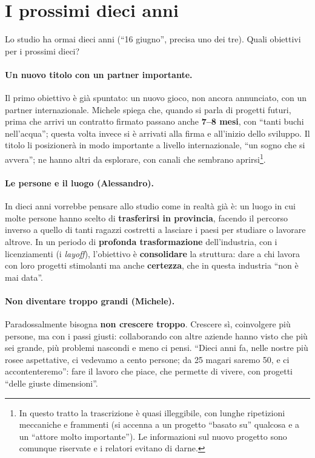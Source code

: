 \section{I prossimi dieci anni}
\label{sec:c1-3-futuro}

Lo studio ha ormai dieci anni (``16 giugno'', precisa uno dei tre). Quali
obiettivi per i prossimi dieci?

\paragraph{Un nuovo titolo con un partner importante.} Il primo obiettivo è già
spuntato: un nuovo gioco, non ancora annunciato, con un partner internazionale.
Michele spiega che, quando si parla di progetti futuri, prima che arrivi un
contratto firmato passano anche \textbf{7--8 mesi}, con ``tanti buchi
nell'acqua''; questa volta invece si è arrivati alla firma e all'inizio dello
sviluppo. Il titolo li posizionerà in modo importante a livello internazionale,
``un sogno che si avvera''; ne hanno altri da esplorare, con canali che sembrano
aprirsi\footnote{In questo tratto la trascrizione è quasi illeggibile, con
lunghe ripetizioni meccaniche e frammenti (si accenna a un progetto ``basato
su'' qualcosa e a un ``attore molto importante''). Le informazioni sul nuovo
progetto sono comunque riservate e i relatori evitano di darne.}.

\paragraph{Le persone e il luogo (Alessandro).} In dieci anni vorrebbe pensare
allo studio come in realtà già è: un luogo in cui molte persone hanno scelto di
\textbf{trasferirsi in provincia}, facendo il percorso inverso a quello di tanti
ragazzi costretti a lasciare i paesi per studiare o lavorare altrove. In un
periodo di \textbf{profonda trasformazione} dell'industria, con i licenziamenti
(i \emph{layoff}), l'obiettivo è \textbf{consolidare} la struttura: dare a chi
lavora con loro progetti stimolanti ma anche \textbf{certezza}, che in questa
industria ``non è mai data''.

\paragraph{Non diventare troppo grandi (Michele).} Paradossalmente bisogna
\textbf{non crescere troppo}. Crescere sì, coinvolgere più persone, ma con i passi
giusti: collaborando con altre aziende hanno visto che più sei grande, più
problemi nascondi e meno ci pensi. ``Dieci anni fa, nelle nostre più rosee
aspettative, ci vedevamo a cento persone; da 25 magari saremo 50, e ci
accontenteremo'': fare il lavoro che piace, che permette di vivere, con progetti
``delle giuste dimensioni''.


